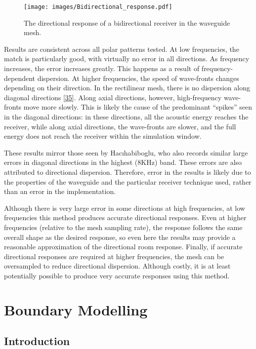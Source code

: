\documentclass[]{scrreprt}
\begin{document}
\begin{figure}[htbp]
\centering
\texttt{[image: images/Bidirectional\_response.pdf]}
\caption{The directional response of a bidirectional receiver in the
waveguide mesh.\label{fig:bidirectional}}
\end{figure}

Results are consistent across all polar patterns tested. At low
frequencies, the match is particularly good, with virtually no error in
all directions. As frequency increases, the error increases greatly.
This happens as a result of frequency-dependent dispersion. At higher
frequencies, the speed of wave-fronts changes depending on their
direction. In the rectilinear mesh, there is no dispersion along
diagonal directions
{[}\protect\hyperlink{ref-kowalczykux5froomux5f2011}{35}{]}. Along axial
directions, however, high-frequency wave-fronts move more slowly. This
is likely the cause of the predominant ``spikes'' seen in the diagonal
directions: in these directions, all the acoustic energy reaches the
receiver, while along axial directions, the wave-fronts are slower, and
the full energy does not reach the receiver within the simulation
window.

These results mirror those seen by Hacıhabiboglu, who also records
similar large errors in diagonal directions in the highest (8KHz) band.
These errors are also attributed to directional dispersion. Therefore,
error in the results is likely due to the properties of the waveguide
and the particular receiver technique used, rather than an error in the
implementation.

Although there is very large error in some directions at high
frequencies, at low frequencies this method produces accurate
directional responses. Even at higher frequencies (relative to the mesh
sampling rate), the response follows the same overall shape as the
desired response, so even here the results may provide a reasonable
approximation of the directional room response. Finally, if accurate
directional responses are required at higher frequencies, the mesh can
be oversampled to reduce directional dispersion. Although costly, it is
at least potentially possible to produce very accurate responses using
this method.

\chapter{Boundary Modelling}\label{boundary-modelling}

\section{Introduction}\label{introduction-2}
\end{document}
